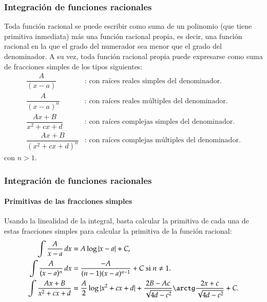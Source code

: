 \begin{frame}
\frametitle{Integración de funciones racionales}
Toda función racional se puede escribir como suma de un polinomio (que tiene primitiva inmediata) más una función racional propia, es decir, una función racional en la que el grado del numerador sea menor que el grado del denominador. A su vez, toda función racional propia puede expresarse como suma de fracciones simples de los tipos siguientes:
\[
\begin{array}{cl}
\dfrac{A}{(x-a)}& \textrm{: con raíces reales simples del denominador.}\\
\dfrac{A}{(x-a)^{n}}& \textrm{: con raíces reales múltiples del denominador.}\\
\dfrac{Ax+B}{x^2+cx+d}& \textrm{: con raíces complejas simples del denominador.}\\
\dfrac{Ax+B}{(x^2+cx+d)^n} & \textrm{: con raíces complejas múltiples del denominador.}
\end{array}
\]
con $n>1$.
\end{frame}


\begin{frame}
\frametitle{Integración de funciones racionales}
\framesubtitle{Primitivas de las fracciones simples}
Usando la linealidad de la integral, basta calcular la primitiva de cada una de estas fracciones simples para calcular
la primitiva de la función racional:
\begin{align*}
\int \frac{A}{x-a}\,dx &= A\log|x-a|+C,\\
\int \frac{A}{(x-a)^n}\,dx &= \frac{-A}{(n-1)(x-a)^{n-1}}+C \textrm{ si $n\neq 1$}.\\
\int \frac{Ax+B}{x^2+cx+d} &= \frac{A}{2}\log|x^2+cx+d|+\frac{2B-Ac}{\sqrt{4d-c^2}}\arctg \frac{2x+c}{\sqrt{4d-c^2}}+C.
\end{align*}

\end{frame}


